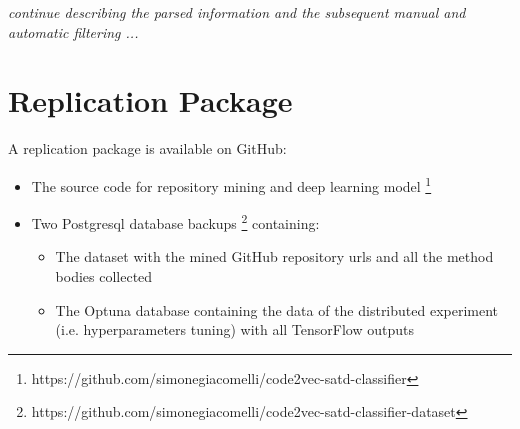 \emph{continue describing the parsed information and the subsequent manual and automatic filtering ...}

\section{Replication Package}
A replication package is available on GitHub:
\begin{itemize}
    \item The source code for repository mining and deep learning model \footnote{https://github.com/simonegiacomelli/code2vec-satd-classifier} 
    \item Two Postgresql database backups \footnote{https://github.com/simonegiacomelli/code2vec-satd-classifier-dataset } containing:
    \begin{itemize}
\item The dataset with the mined GitHub repository urls and all the method bodies collected
\item The Optuna database containing the data of the distributed experiment (i.e. hyperparameters tuning) with all TensorFlow outputs 
\end{itemize}
\end{itemize}
